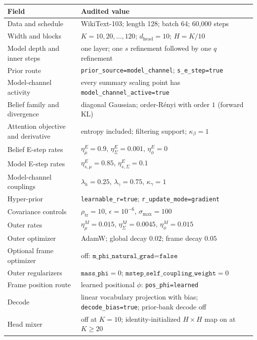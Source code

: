 \documentclass[twoside,11pt]{article}
\begin{document}
\begin{table}[h]
\centering
\small
\begin{tabular}{ll}
\hline
Field & Audited value \\
\hline
Data and schedule & WikiText-103; length 128; batch 64; 60{,}000 steps \\
Width and blocks & $K=10,20,\ldots,120$; $d_{\mathrm{head}}=10$; $H=K/10$ \\
Model depth and inner steps & one layer; one $s$ refinement followed by one $q$ refinement \\
Prior route & \texttt{prior\_source=model\_channel}; \texttt{s\_e\_step=true} \\
Model-channel activity & every summary scaling point has \texttt{model\_channel\_active=true} \\
Belief family and divergence & diagonal Gaussian; order-R\'enyi with order $1$ (forward KL) \\
Attention objective and derivative & entropy included; filtering support; $\kappa_\beta=1$ \\
Belief E-step rates & $\eta_\mu^E=0.9$, $\eta_\Sigma^E=0.001$, $\eta_\phi^E=0$ \\
Model E-step rates & $\eta_{s,\mu}^E=0.85$, $\eta_{s,\Sigma}^E=0.1$ \\
Model-channel couplings & $\lambda_h=0.25$, $\lambda_\gamma=0.75$, $\kappa_\gamma=1$ \\
Hyper-prior & \texttt{learnable\_r=true}; \texttt{r\_update\_mode=gradient} \\
Covariance controls & $\rho_{\mathrm{tr}}=10$, $\epsilon=10^{-6}$, $\sigma_{\max}=100$ \\
Outer rates & $\eta_\mu^M=0.015$, $\eta_\Sigma^M=0.0045$, $\eta_\phi^M=0.015$ \\
Outer optimizer & AdamW; global decay $0.02$; frame decay $0.05$ \\
Optional frame optimizer & off: $\texttt{m\_phi\_natural\_grad=false}$ \\
Outer regularizers & $\texttt{mass\_phi}=0$; $\texttt{mstep\_self\_coupling\_weight}=0$ \\
Frame position route & learned positional $\phi$: \texttt{pos\_phi=learned} \\
Decode & linear vocabulary projection with bias; \texttt{decode\_bias=true}; prior-bank decode off \\
Head mixer & off at $K=10$; identity-initialized $H\times H$ map on at $K\geq20$ \\
\hline
\end{tabular}

\end{table}
\end{document}
